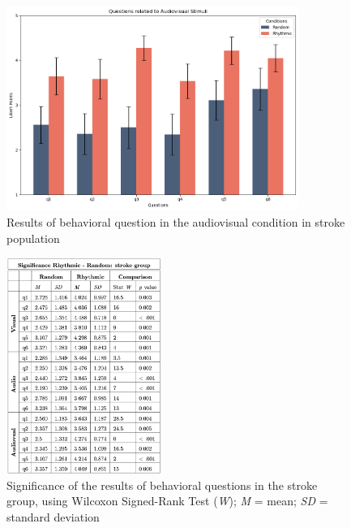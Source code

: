 \begin{figure}[H]
    \centering
    \includegraphics[width=0.85\textwidth]{bar_plots/plotbar_audiovisual_s.png}
    \caption{Results of behavioral question in the audiovisual condition in stroke population}
    \label{fig: bar_audiovisual_stroke} 
\end{figure} 
\begin{figure}[H]
    \centering
    \includegraphics[width=0.45\textwidth]{significance_tables/stroke_group.png}
    \caption{Significance of the results of behavioral questions in the stroke group, using Wilcoxon Signed-Rank Test (\textit{W}); \textit{M} = mean; \textit{SD} = standard deviation}
    \label{fig: significance_stroke_pop} 
\end{figure} 

\clearpage
